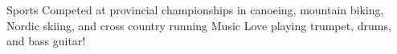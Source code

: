 
\begin{cvskills}
  \cvskill
    {Sports} %
    {Competed at provincial championships in canoeing, mountain biking, Nordic skiing, and cross country running}
  \cvskill
    {Music} %
    {Love playing trumpet, drums, and bass guitar!}
\end{cvskills}